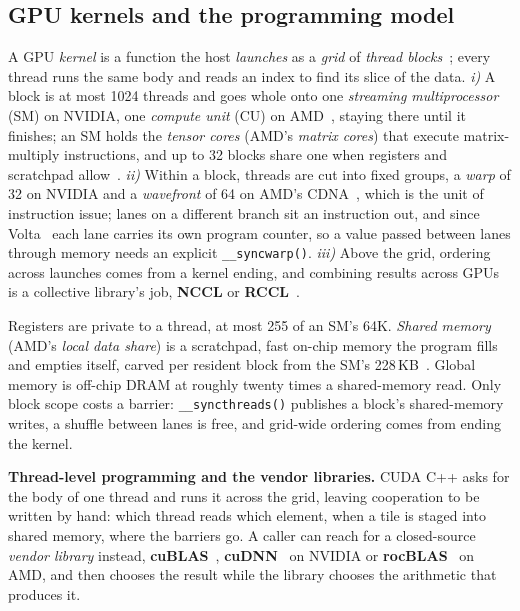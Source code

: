 \documentclass[sigplan,nonacm]{acmart}
\begin{document}
\subsection{GPU kernels and the programming model}
\label{sec:kernels}

A GPU \emph{kernel} is a function the host \emph{launches} as a \emph{grid} of
\emph{thread blocks}~\cite{cuda_prog_guide,hip_prog_model,nickolls2008cuda};
every thread runs the same body and reads an index to find its slice of the
data.
\emph{i)} A block is at most 1024 threads and goes whole onto one \emph{streaming
multiprocessor} (SM) on NVIDIA, one \emph{compute unit} (CU) on
AMD~\cite{lindholm2008tesla}, staying there until it finishes; an SM holds the
\emph{tensor cores} (AMD's \emph{matrix cores}) that execute matrix-multiply
instructions, and up to 32 blocks share one when registers and scratchpad
allow~\cite{blackwell_tuning}.
\emph{ii)} Within a block, threads are cut into fixed groups, a \emph{warp} of 32
on NVIDIA and a \emph{wavefront} of 64 on AMD's CDNA~\cite{cdna3_whitepaper},
which is the unit of instruction issue; lanes on a different branch sit an
instruction out, and since Volta~\cite{volta_whitepaper} each lane carries its
own program counter, so a value passed between lanes through memory needs an
explicit \texttt{\_\_syncwarp()}.
\emph{iii)} Above the grid, ordering across launches comes from a kernel ending,
and combining results across GPUs is a collective library's job, \textbf{NCCL} or
\textbf{RCCL}~\cite{thakur2005collectives}.

Registers are private to a thread, at most 255 of an SM's 64K. \emph{Shared
memory} (AMD's \emph{local data share}) is a scratchpad, fast on-chip memory the
program fills and empties itself, carved per resident block from the SM's
228\,KB~\cite{blackwell_tuning}. Global memory is off-chip DRAM at roughly twenty
times a shared-memory read.
Only block scope costs a barrier: \texttt{\_\_sync\allowbreak threads()} publishes a block's
shared-memory writes, a shuffle between lanes is free, and grid-wide ordering
comes from ending the kernel.

\textbf{Thread-level programming and the vendor libraries.}
CUDA C++ asks for the body of one thread and runs it across the grid, leaving
cooperation to be written by hand: which thread reads which element, when a tile
is staged into shared memory, where the barriers go. A caller can reach for a
closed-source \emph{vendor library} instead, \textbf{cuBLAS}~\cite{cublas_docs},
\textbf{cuDNN}~\cite{cudnn2014} on NVIDIA or \textbf{rocBLAS}~\cite{rocblas_docs}
on AMD, and then chooses the result while the library chooses the arithmetic that
produces it.
\end{document}

